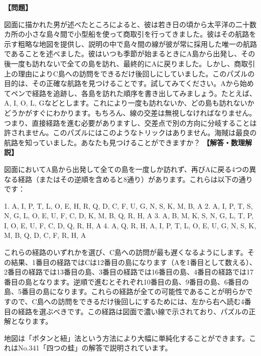 \documentclass[10pt,a4paper,oneside,openany]{ltjsbook}
\begin{document}
\begin{tcolorbox}[colback=softblue,colframe=primaryblue,title=\textbf{第 249 問：海賊のパズル （原題: THE SAILOR'S PUZZLE.）},arc=2mm,boxrule=1pt,breakable]
\textbf{【問題】}\par\vspace{0.3em}
図面に描かれた男が述べたところによると、彼は若き日の頃から太平洋の二十数カ所の小さな島々間で小型船を使って商取引を行ってきました。彼はその航路を示す粗略な地図を提供し、説明の中で島々間の線が彼が常に採用した唯一の航路であることを述べました。彼はいつも季節が始まるときにA島から出発し、その後一度も訪れないで全ての島を訪れ、最終的にAに戻りました。しかし、商取引上の理由によりC島への訪問をできるだけ後回しにしていました。このパズルの目的は、その正確な航路を見つけることです。試してみてください。Aから始めてペンで経路を追跡し、各島を訪れた順序を書き出してみましょう。たとえば、A, I, O, L, Gなどとします。これにより一度も訪れないか、どの島も訪れないかどうかがすぐにわかります。もちろん、線の交差は無視しなければなりません。つまり、直接経路を進む必要がありますし、交差点で別の方向に分岐することは許されません。このパズルにはこのようなトリックはありません。海賊は最良の航路を知っていました。あなたも見つけることができますか？
\tcblower
\textbf{【解答・数理解説】}\par\vspace{0.3em}
図面においてA島から出発して全ての島を一度しか訪れず、再びAに戻る4つの異なる経路（またはその逆順を含めると8通り）があります。これらは以下の通りです：

1. A, I, P, T, L, O, E, H, R, Q, D, C, F, U, G, N, S, K, M, B, A
2. A, I, P, T, S, N, G, L, O, E, U, F, C, D, K, M, B, Q, R, H, A
3. A, B, M, K, S, N, G, L, T, P, I, O, E, U, F, C, D, Q, R, H, A
4. A, Q, R, H, A, I, P, T, L, O, E, U, G, N, S, K, M, B, Q, D, C, F, R, H, A

これらの経路のいずれかを選び、C島への訪問が最も遅くなるようにします。その結果、1番目の経路ではCは12番目の島になります（Aを1番目として数える）、2番目の経路では13番目の島、3番目の経路では16番目の島、4番目の経路では17番目の島となります。逆順で進むとそれぞれ10番目の島、9番目の島、6番目の島、5番目の島になります。これらの経路が全ての可能性であることが明らかですので、C島への訪問をできるだけ後回しにするためには、左から右へ読む4番目の経路を選ぶべきです。この経路は図面で濃い線で示されており、パズルの正解となります。

地図は「ボタンと紐」法という方法により大幅に単純化することができます。これはNo.341「四つの蛙」の解答で説明されています。
\end{tcolorbox}
\end{document}
